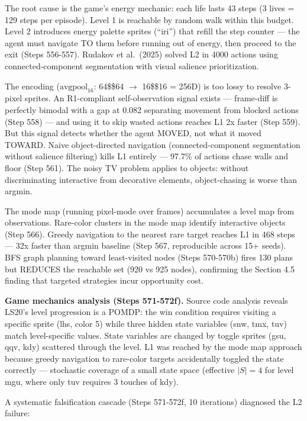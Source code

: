 \documentclass[
  11pt,
]{article}
\begin{document}
The root cause is the game's energy mechanic: each life lasts 43 steps
(3 lives = 129 steps per episode). Level 1 is reachable by random walk
within this budget. Level 2 introduces energy palette sprites (``iri'')
that refill the step counter --- the agent must navigate TO them before
running out of energy, then proceed to the exit (Steps 556-557). Rudakov
et al.~(2025) solved L2 in 4000 actions using connected-component
segmentation with visual salience prioritization.

The encoding (\(\text{avgpool}_{16}\): 64\$\times\$64 \(\to\)
16\$\times\$16 = 256D) is too lossy to resolve 3-pixel sprites. An
R1-compliant self-observation signal exists --- frame-diff is perfectly
bimodal with a gap at 0.082 separating movement from blocked actions
(Step 558) --- and using it to skip wasted actions reaches L1 2x faster
(Step 559). But this signal detects whether the agent MOVED, not what it
moved TOWARD. Naive object-directed navigation (connected-component
segmentation without salience filtering) kills L1 entirely --- 97.7\% of
actions chase walls and floor (Step 561). The noisy TV problem applies
to objects: without discriminating interactive from decorative elements,
object-chasing is worse than argmin.

The mode map (running pixel-mode over frames) accumulates a level map
from observations. Rare-color clusters in the mode map identify
interactive objects (Step 566). Greedy navigation to the nearest rare
target reaches L1 in 468 steps --- 32x faster than argmin baseline (Step
567, reproducible across 15+ seeds). BFS graph planning toward
least-visited nodes (Steps 570-570b) fires 130 plans but REDUCES the
reachable set (920 vs 925 nodes), confirming the Section 4.5 finding
that targeted strategies incur opportunity cost.

\textbf{Game mechanics analysis (Steps 571-572f).} Source code analysis
reveals LS20's level progression is a POMDP: the win condition requires
visiting a specific sprite (lhs, color 5) while three hidden state
variables (snw, tmx, tuv) match level-specific values. State variables
are changed by toggle sprites (gsu, qqv, kdy) scattered through the
level. L1 was reached by the mode map approach because greedy navigation
to rare-color targets accidentally toggled the state correctly ---
stochastic coverage of a small state space (effective \(|S| = 4\) for
level mgu, where only tuv requires 3 touches of kdy).

A systematic falsification cascade (Steps 571-572f, 10 iterations)
diagnosed the L2 failure:
\end{document}

